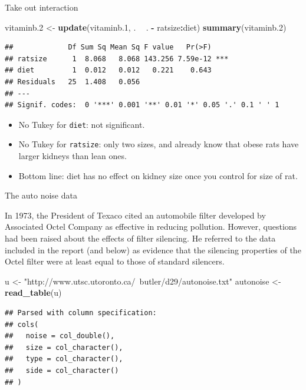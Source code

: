 \documentclass[ignorenonframetext,]{beamer}
\newenvironment{Shaded}{\begin{snugshade}}{\end{snugshade}}
\newcommand{\FloatTok}[1]{\textcolor[rgb]{0.00,0.00,0.81}{#1}}
\newcommand{\KeywordTok}[1]{\textcolor[rgb]{0.13,0.29,0.53}{\textbf{#1}}}
\newcommand{\NormalTok}[1]{#1}
\newcommand{\OperatorTok}[1]{\textcolor[rgb]{0.81,0.36,0.00}{\textbf{#1}}}
\newcommand{\StringTok}[1]{\textcolor[rgb]{0.31,0.60,0.02}{#1}}
\begin{document}
\begin{frame}[fragile]{Take out interaction}
\protect\hypertarget{take-out-interaction}{}

\small

\begin{Shaded}
\begin{Highlighting}[]
\NormalTok{vitaminb}\FloatTok{.2}\NormalTok{ <-}\StringTok{ }\KeywordTok{update}\NormalTok{(vitaminb}\FloatTok{.1}\NormalTok{, . }\OperatorTok{~}\StringTok{ }\NormalTok{. }\OperatorTok{-}\StringTok{ }\NormalTok{ratsize}\OperatorTok{:}\NormalTok{diet)}
\KeywordTok{summary}\NormalTok{(vitaminb}\FloatTok{.2}\NormalTok{)}
\end{Highlighting}
\end{Shaded}

\begin{verbatim}
##             Df Sum Sq Mean Sq F value   Pr(>F)    
## ratsize      1  8.068   8.068 143.256 7.59e-12 ***
## diet         1  0.012   0.012   0.221    0.643    
## Residuals   25  1.408   0.056                     
## ---
## Signif. codes:  0 '***' 0.001 '**' 0.01 '*' 0.05 '.' 0.1 ' ' 1
\end{verbatim}

\normalsize

\begin{itemize}
\item
  No Tukey for \texttt{diet}: not significant.
\item
  No Tukey for \texttt{ratsize}: only two sizes, and already know that
  obese rats have larger kidneys than lean ones.
\item
  Bottom line: diet has no effect on kidney size once you control for
  size of rat.
\end{itemize}

\end{frame}

\begin{frame}[fragile]{The auto noise data}
\protect\hypertarget{the-auto-noise-data}{}

In 1973, the President of Texaco cited an automobile filter developed by
Associated Octel Company as effective in reducing pollution. However,
questions had been raised about the effects of filter silencing. He
referred to the data included in the report (and below) as evidence that
the silencing properties of the Octel filter were at least equal to
those of standard silencers.

\begin{Shaded}
\begin{Highlighting}[]
\NormalTok{u <-}\StringTok{ "http://www.utsc.utoronto.ca/~butler/d29/autonoise.txt"}
\NormalTok{autonoise <-}\StringTok{ }\KeywordTok{read_table}\NormalTok{(u)}
\end{Highlighting}
\end{Shaded}

\begin{verbatim}
## Parsed with column specification:
## cols(
##   noise = col_double(),
##   size = col_character(),
##   type = col_character(),
##   side = col_character()
## )
\end{verbatim}

\end{frame}
\end{document}
